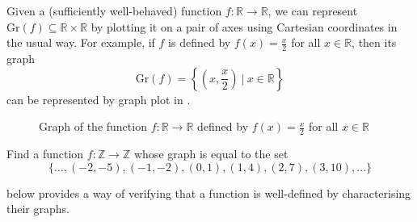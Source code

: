 \begin{example}
\label{exGraphsOfFunctionsRToR}
Given a (sufficiently well-behaved) function $f : \mathbb{R} \to \mathbb{R}$, we can represent $\mathrm{Gr}(f) \subseteq \mathbb{R} \times \mathbb{R}$ by plotting it on a pair of axes using Cartesian coordinates in the usual way. For example, if $f$ is defined by $f(x)=\frac{x}{2}$ for all $x \in \mathbb{R}$, then its graph
\[ \mathrm{Gr}(f) = \left\{ \left( x, \frac{x}{2} \right) \ \bigg|\ x \in \mathbb{R} \right\} \]
can be represented by graph plot in .

\begin{figure}[H]
\centering
{}
\caption{Graph of the function $f : \mathbb{R} \to \mathbb{R}$ defined by $f(x) = \frac{x}{2}$ for all $x \in \mathbb{R}$}
\label{figGraphOfXOverTwo}
\end{figure}
\end{example}

\begin{exercise}
Find a function $f : \mathbb{Z} \to \mathbb{Z}$ whose graph is equal to the set
\[ \{ \dots, ({-2}, {-5}), ({-1}, {-2}), (0, 1), (1, 4), (2, 7), (3, 10), \dots \} \]
\end{exercise}

 below provides a way of verifying that a function is well-defined by characterising their graphs.

